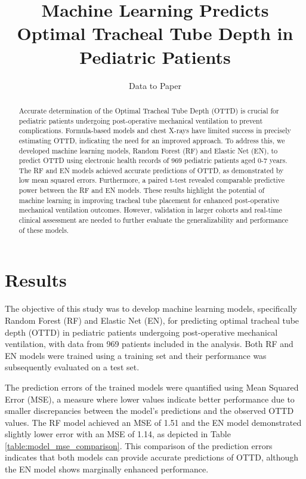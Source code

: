 \documentclass[11pt]{article}
\title{Machine Learning Predicts Optimal Tracheal Tube Depth in Pediatric Patients}
\author{Data to Paper}
\begin{document}
\maketitle
\begin{abstract}
Accurate determination of the Optimal Tracheal Tube Depth (OTTD) is crucial for pediatric patients undergoing post-operative mechanical ventilation to prevent complications. Formula-based models and chest X-rays have limited success in precisely estimating OTTD, indicating the need for an improved approach. To address this, we developed machine learning models, Random Forest (RF) and Elastic Net (EN), to predict OTTD using electronic health records of 969 pediatric patients aged 0-7 years. The RF and EN models achieved accurate predictions of OTTD, as demonstrated by low mean squared errors. Furthermore, a paired t-test revealed comparable predictive power between the RF and EN models. These results highlight the potential of machine learning in improving tracheal tube placement for enhanced post-operative mechanical ventilation outcomes. However, validation in larger cohorts and real-time clinical assessment are needed to further evaluate the generalizability and performance of these models. 
\end{abstract}
\section*{Results}

The objective of this study was to develop machine learning models, specifically Random Forest (RF) and Elastic Net (EN), for predicting optimal tracheal tube depth (OTTD) in pediatric patients undergoing post-operative mechanical ventilation, with data from 969 patients included in the analysis. Both RF and EN models were trained using a training set and their performance was subsequently evaluated on a test set.

The prediction errors of the trained models were quantified using Mean Squared Error (MSE), a measure where lower values indicate better performance due to smaller discrepancies between the model's predictions and the observed OTTD values. The RF model achieved an MSE of 1.51 and the EN model demonstrated slightly lower error with an MSE of 1.14, as depicted in Table \ref{table:model_mse_comparison}. This comparison of the prediction errors indicates that both models can provide accurate predictions of OTTD, although the EN model shows marginally enhanced performance.
\end{document}
